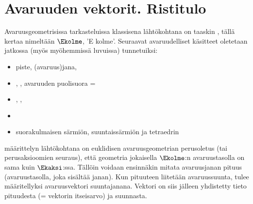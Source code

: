 \section{Avaruuden vektorit. Ristitulo} \label{ristitulo}
\alku
{}


Avaruusgeometrisissa tarkasteluissa klassisena lähtökohtana on taaskin
, tällä kertaa nimeltään $\Ekolme$, 'E kolme'. Seuraavat
avaruudelliset käsitteet oletetaan jatkossa (myös myöhemmissä luvuissa) tunnetuiksi:
\begin{itemize}
\item piste, (avaruus)jana, 
\item {}, , avaruuden puolisuora = 
\item {}, , 
\item {}
\item suorakulmaisen särmiön, suuntaissärmiön ja tetraedrin 
\end{itemize}
 määrittelyn lähtökohtana on euklidisen avaruusgeometrian perusoletus
(tai perusaksioomien seuraus), että geometria jokaisella $\Ekolme$:n avaruustasolla on sama kuin
$\Ekaksi$:ssa. Tällöin voidaan ensinnäkin mitata avaruusjanan pituus (avaruustasolla, joka 
sisältää janan). Kun pituuteen liitetään avaruussuunta, tulee määritellyksi avaruusvektori 
suuntajanana. Vektori on siis jälleen yhdistetty tieto pituudesta (= vektorin itseisarvo) ja
suunnasta.

